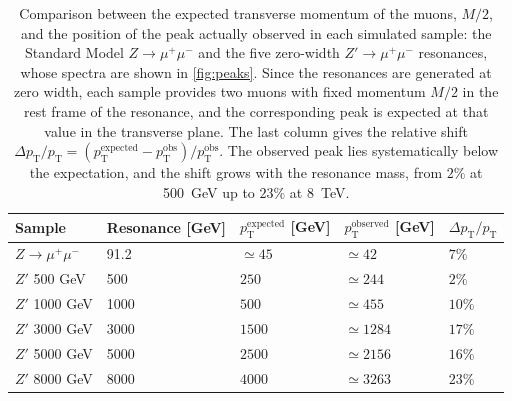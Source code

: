 \documentclass[11pt,a4paper,twoside,openright]{report}
\begin{document}
\noindent
\begin{table}[htbp]
    \centering
    \begin{tabularx}{\textwidth}{X|X|X|X|X}
        \toprule
        Sample & Resonance [GeV] & $p_{\mathrm{T}}^{\mathrm{expected}}$ [GeV] & $p_{\mathrm{T}}^{\mathrm{observed}}$ [GeV] & $\Delta p_{\mathrm{T}}/p_{\mathrm{T}}$ \\
        \midrule
        $Z \to \mu^+\mu^-$ & 91.2 & $\simeq 45$   & $\simeq 42$   & $7\%$  \\
        $Z'$ 500 GeV       & 500  & $250$         & $\simeq 244$  & $2\%$  \\
        $Z'$ 1000 GeV      & 1000 & $500$         & $\simeq 455$  & $10\%$ \\
        $Z'$ 3000 GeV      & 3000 & $1500$        & $\simeq 1284$ & $17\%$ \\
        $Z'$ 5000 GeV      & 5000 & $2500$        & $\simeq 2156$ & $16\%$ \\
        $Z'$ 8000 GeV      & 8000 & $4000$        & $\simeq 3263$ & $23\%$ \\
        \bottomrule
    \end{tabularx}
    \caption{Comparison between the expected transverse momentum of the muons, $M/2$, and the position of the peak actually observed in each simulated sample: the Standard Model $Z \to \mu^+\mu^-$ and the five zero-width $Z' \to \mu^+\mu^-$ resonances, whose spectra are shown in \cref{fig:peaks}. Since the resonances are generated at zero width, each sample provides two muons with fixed momentum $M/2$ in the rest frame of the resonance, and the corresponding peak is expected at that value in the transverse plane. The last column gives the relative shift $\Delta p_{\mathrm{T}}/p_{\mathrm{T}} = (p_{\mathrm{T}}^{\mathrm{expected}} - p_{\mathrm{T}}^{\mathrm{obs}})/p_{\mathrm{T}}^{\mathrm{obs}}$. The observed peak lies systematically below the expectation, and the shift grows with the resonance mass, from $2\%$ at 500~GeV up to $23\%$ at 8~TeV.}
    \label{tab:peaks}
\end{table}
\end{document}
